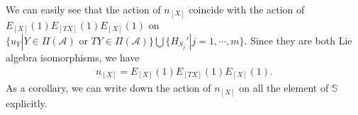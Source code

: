 \documentclass[12pt]{amsart}
\begin{document}

We can easily see that the action of $n_{[X]}$ coincide with the action of $E_{[X]}(1) E_{[TX]}(1) E_{[X]}(1)$ on $\{u_Y| Y \in \Pi(\mathcal{A}) \text{ or } TY \in \Pi(\mathcal{A}) \} \bigcup \{H_{S_j}'|j=1,\cdots,m \}$. 
Since they are both Lie algebra isomorphisms, we have 
\begin{align*}
    n_{[X]} = E_{[X]}(1) E_{[TX]}(1) E_{[X]}(1).
\end{align*}
As a corollary, we can write down the action of $n_{[X]}$ on all the element of $\mathbb{S}$ explicitly.
\end{document}
